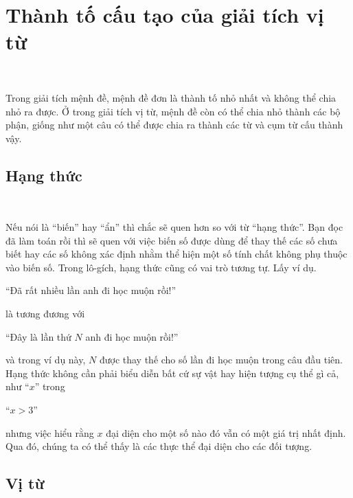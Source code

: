 \section{Thành tố cấu tạo của giải tích vị từ}

\ %

Trong giải tích mệnh đề, mệnh đề đơn là thành tố nhỏ nhất và không thể chia nhỏ ra được. Ở trong giải tích vị từ, mệnh đề còn có thể chia nhỏ thành các bộ phận, giống như một câu có thể được chia ra thành các từ và cụm từ cấu thành vậy.

\subsection{Hạng thức}

\ %

Nếu nói là ``biến'' hay ``ẩn'' thì chắc sẽ quen hơn so với từ ``hạng thức''. Bạn đọc đã làm toán rồi thì sẽ quen với việc biến số được dùng để thay thế các số chưa biết hay các số không xác định nhằm thể hiện một số tính chất không phụ thuộc vào biến số. Trong lô-gích, hạng thức cũng có vai trò tương tự. Lấy ví dụ.
\begin{center}
    ``Đã rất nhiều lần anh đi học muộn rồi!''
\end{center}
là tương đương với
\begin{center}
    ``Đây là lần thứ $N$ anh đi học muộn rồi!''
\end{center}
và trong ví dụ này, $N$ được thay thế cho số lần đi học muộn trong câu đầu tiên. Hạng thức không cần phải biểu diễn bất cứ sự vật hay hiện tượng cụ thể gì cả, như ``$x$'' trong
\begin{center}
    ``$x > 3$''
\end{center}
nhưng việc hiểu rằng $x$ đại diện cho một số nào đó vẫn có một giá trị nhất định. Qua đó, chúng ta có thể thấy  là các thực thể đại diện cho các đối tượng.

\subsection{Vị từ}

\ %

